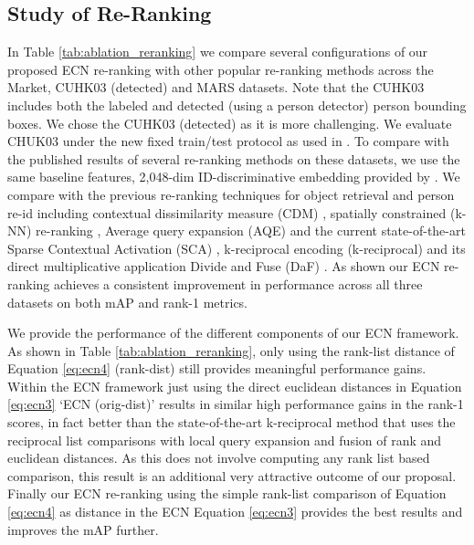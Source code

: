 \documentclass[10pt,twocolumn,letterpaper]{article}
\begin{document}
\subsection{Study of Re-Ranking}
\label{sec:eval-rerank}

In Table \ref{tab:ablation_reranking} we compare several configurations of our proposed ECN 
re-ranking with other popular re-ranking methods across the Market, CUHK03 (detected) \cite{li2014deepreid} and MARS datasets. Note that the CUHK03 includes both the labeled and detected (using a person detector) person bounding boxes. We chose the CUHK03 (detected) as it is more challenging. We evaluate CHUK03 under the new fixed train/test protocol as used in \cite{zhong2017re} \cite{yu2017divide}.
To compare with the published results of several re-ranking methods on these datasets, we use the same baseline features, 2,048-dim ID-discriminative embedding provided by \cite{zhong2017re}. We compare with the previous re-ranking techniques for object retrieval and person re-id including contextual dissimilarity measure (CDM) \cite{jegou2007contextual}, spatially constrained (k-NN) re-ranking \cite{shen2012object}, Average query expansion (AQE) \cite{chum2007total}  and the current state-of-the-art Sparse Contextual Activation (SCA) \cite{bai2016sparse} , k-reciprocal encoding (k-reciprocal) \cite{zhong2017re} and its direct multiplicative application Divide and Fuse (DaF) \cite{yu2017divide}.
As shown our ECN re-ranking achieves a consistent improvement in performance across all three datasets on both mAP and rank-1 metrics. 

We provide the performance of the different components of our ECN framework. As shown in Table \ref{tab:ablation_reranking}, only using the rank-list distance of Equation \ref{eq:ecn4} (rank-dist) still provides meaningful performance gains. Within the ECN framework just using the direct euclidean distances in Equation \ref{eq:ecn3} `ECN (orig-dist)' results in similar high performance gains in the rank-1 scores, in fact better than the state-of-the-art k-reciprocal \cite{zhong2017re} method that uses the reciprocal list comparisons with local query expansion and fusion of rank and euclidean distances. As this does not involve computing any rank list based comparison, this result is an additional very attractive outcome of our proposal. Finally our ECN re-ranking using the simple rank-list comparison of Equation \ref{eq:ecn4} as distance in the ECN Equation \ref{eq:ecn3} provides the best results and improves the mAP further.
\end{document}
